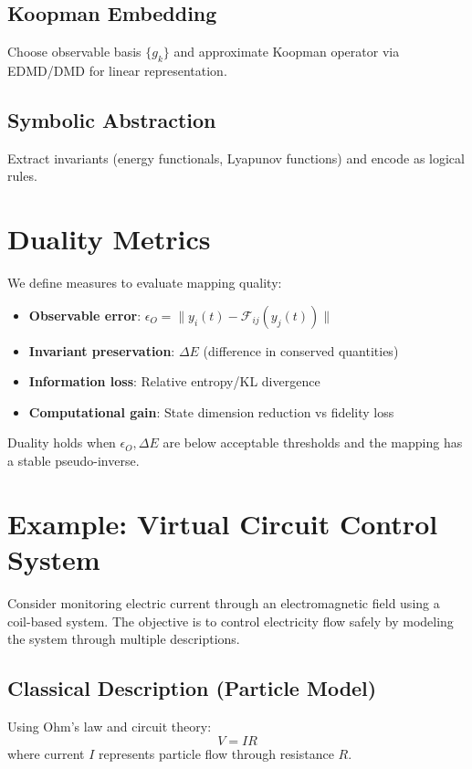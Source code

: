 \documentclass[11pt,a4paper]{article}
\begin{document}
\subsection{Koopman Embedding}
Choose observable basis $\{g_k\}$ and approximate Koopman operator via EDMD/DMD for linear representation.

\subsection{Symbolic Abstraction}
Extract invariants (energy functionals, Lyapunov functions) and encode as logical rules.

\section{Duality Metrics}
\label{sec:metrics}

We define measures to evaluate mapping quality:
\begin{itemize}
    \item \textbf{Observable error}: $\epsilon_O = \|y_i(t) - \mathcal{F}_{ij}(y_j(t))\|$
    \item \textbf{Invariant preservation}: $\Delta E$ (difference in conserved quantities)
    \item \textbf{Information loss}: Relative entropy/KL divergence
    \item \textbf{Computational gain}: State dimension reduction vs fidelity loss
\end{itemize}

Duality holds when $\epsilon_O, \Delta E$ are below acceptable thresholds and the mapping has a stable pseudo-inverse.

\section{Example: Virtual Circuit Control System}
\label{sec:example}

Consider monitoring electric current through an electromagnetic field using a coil-based system. The objective is to control electricity flow safely by modeling the system through multiple descriptions.

\subsection{Classical Description (Particle Model)}
Using Ohm's law and circuit theory:
\begin{equation}
V = IR
\end{equation}
where current $I$ represents particle flow through resistance $R$.
\end{document}
